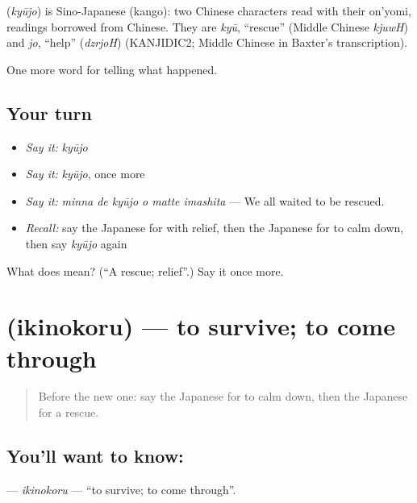 \begin{cousinweb}
\textbf{} (\emph{kyūjo}) is Sino-Japanese (kango): two Chinese characters read with their on'yomi, readings borrowed from Chinese. They are \emph{kyū}, \textquotedblleft{}rescue\textquotedblright{} (Middle Chinese \emph{kjuwH}) and \emph{jo}, \textquotedblleft{}help\textquotedblright{} (\emph{dzrjoH}) (KANJIDIC2; Middle Chinese in Baxter's transcription).
\end{cousinweb}

\begin{grammarlens}[title={What you've built}]
One more word for telling what happened.
\end{grammarlens}

\subsection*{Your turn}
\begin{itemize}
\raggedright
  \item \emph{Say it:} \emph{kyūjo}
  \item \emph{Say it:} \emph{kyūjo}, once more
  \item \emph{Say it:} \emph{minna de kyūjo o matte imashita} — We all waited to be rescued.
  \item \emph{Recall:} say the Japanese for with relief, then the Japanese for to calm down, then say \emph{kyūjo} again
\end{itemize}

\begin{tcolorbox}[breakable,colback=teal!4,colframe=teal!35!black,title={Before you move on}]
What does  mean? (\textquotedblleft{}A rescue; relief\textquotedblright{}.) Say it once more.
\end{tcolorbox}
\section[\texorpdfstring{\ja{いきのこる} (ikinokoru)}{いきのこる (ikinokoru)}]{ (ikinokoru) — to survive; to come through}

\label{lesson:JA-C268-ikinokoru}



\begin{quote}
Before the new one: say the Japanese for to calm down, then the Japanese for a rescue.
\end{quote}

\subsection*{You'll want to know: }
\textbf{} — \emph{ikinokoru} — \textquotedblleft{}to survive; to come through\textquotedblright{}.

